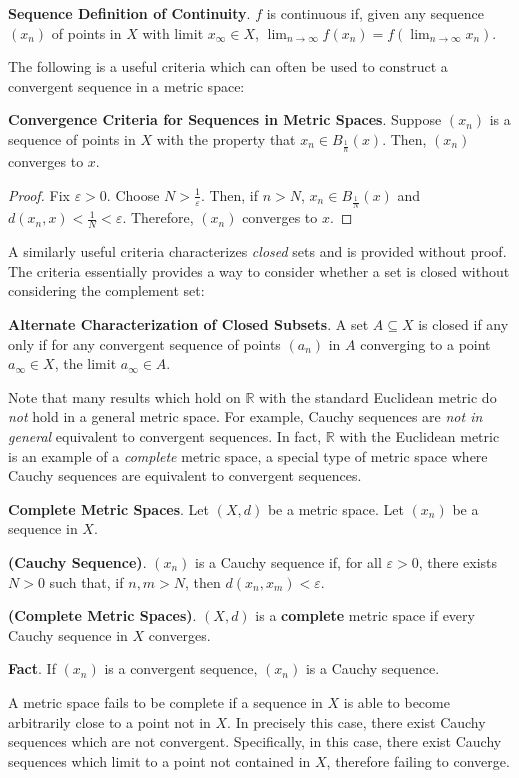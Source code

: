 \textbf{Sequence Definition of Continuity}. $f$ is continuous if, given any sequence $(x_n)$ of points in $X$ with limit $x_\infty\in X$, $\displaystyle\lim_{n\to\infty} f(x_n) = f(\displaystyle\lim_{n\to\infty} x_n)$.

The following is a useful criteria which can often be used to construct a convergent sequence in a metric space:

\textbf{Convergence Criteria for Sequences in Metric Spaces}. Suppose $(x_n)$ is a sequence of points in $X$ with the property that $x_n\in B_{\frac{1}{n}}(x)$. Then, $(x_n)$ converges to $x$. \begin{proof}
    Fix $\varepsilon>0$. Choose $N>\frac{1}{\varepsilon}$. Then, if $n>N$, $x_n\in B_\frac{1}{N}(x)$ and $d(x_n,x) < \frac{1}{N} < \varepsilon$. Therefore, $(x_n)$ converges to $x$.
\end{proof}

A similarly useful criteria characterizes \textit{closed} sets and is provided without proof. The criteria essentially provides a way to consider whether a set is closed without considering the complement set:

\textbf{Alternate Characterization of Closed Subsets}. A set $A\subseteq X$ is closed if any only if for any convergent sequence of points $(a_n)$ in $A$ converging to a point $a_\infty\in X$, the limit $a_\infty\in A$.

Note that many results which hold on $\mathbb{R}$ with the standard Euclidean metric do \textit{not} hold in a general metric space. For example, Cauchy sequences are \textit{not in general} equivalent to convergent sequences. In fact, $\mathbb{R}$ with the Euclidean metric is an example of a \textit{complete} metric space, a special type of metric space where Cauchy sequences are equivalent to convergent sequences.

\begin{shaded}
    \textbf{Complete Metric Spaces}. Let $(X,d)$ be a metric space. Let $(x_n)$ be a sequence in $X$.

    \begin{defn}
        \textbf{(Cauchy Sequence)}. $(x_n)$ is a Cauchy sequence if, for all $\varepsilon>0$, there exists $N>0$ such that, if $n,m>N$, then $d(x_n,x_m)<\varepsilon$.
    \end{defn}

    \begin{defn}
        \textbf{(Complete Metric Spaces)}. $(X,d)$ is a \textbf{complete} metric space if every Cauchy sequence in $X$ converges.
    \end{defn}

    \textbf{Fact}. If $(x_n)$ is a convergent sequence, $(x_n)$ is a Cauchy sequence.
\end{shaded}
A metric space fails to be complete if a sequence in $X$ is able to become arbitrarily close to a point not in $X$. In precisely this case, there exist Cauchy sequences which are not convergent. Specifically, in this case, there exist Cauchy sequences which limit to a point not contained in $X$, therefore failing to converge.

